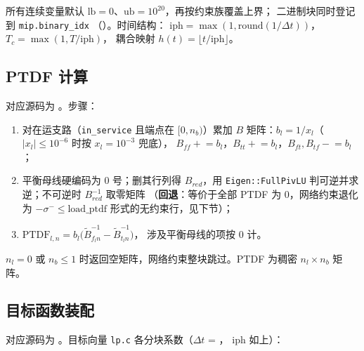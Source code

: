 所有连续变量默认 $\mathrm{lb}=0$、$\mathrm{ub}=10^{20}$，再按约束族覆盖上界；
二进制块同时登记到 \texttt{mip.binary\_idx}
（）。时间结构：
$\mathrm{iph}=\max(1,\mathrm{round}(1/\Delta t))$，$T_c=\max(1,T/\mathrm{iph})$，
耦合映射 $h(t)=\lfloor t/\mathrm{iph}\rfloor$。

\subsection{PTDF 计算}

对应源码为 。步骤：
\begin{enumerate}
  \item 对在运支路（\texttt{in\_service} 且端点在 $[0,n_b)$）累加
        $B$ 矩阵：$b_l=1/x_l$（$|x_l|\le 10^{-6}$ 时按 $x_l=10^{-3}$ 兜底），
        $B_{ff}\mathrel{+}=b_l$，$B_{tt}\mathrel{+}=b_l$，$B_{ft},B_{tf}\mathrel{-}=b_l$；
  \item 平衡母线硬编码为 0 号；删其行列得 $B_{red}$，用
        \texttt{Eigen::FullPivLU} 判可逆并求逆；不可逆时 $B^{-1}_{red}$ 取零矩阵
        （\textbf{回退}：等价于全部 PTDF 为 0，网络约束退化为
        $-\sigma^-\le \mathrm{load\_ptdf}$ 形式的无约束行，见下节）；
  \item $\mathrm{PTDF}_{l,n}=b_l\big(\tilde B^{-1}_{f_l n}-\tilde B^{-1}_{t_l n}\big)$，
        涉及平衡母线的项按 0 计。
\end{enumerate}
$n_l=0$ 或 $n_b\le 1$ 时返回空矩阵，网络约束整块跳过。PTDF 为稠密
$n_l\times n_b$ 矩阵。

\subsection{目标函数装配}

对应源码为 。目标向量
\texttt{lp.c} 各分块系数（$\Delta t$ = ，
$\mathrm{iph}$ 如上）：

